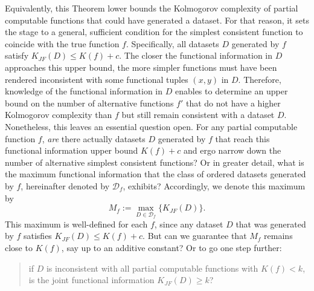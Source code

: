 Equivalently, this Theorem lower bounds the Kolmogorov complexity of partial computable functions that could have generated a dataset.
For that reason, it sets the stage to a general, sufficient condition for the simplest consistent function to coincide with the true function $f$.
Specifically, all datasets $D$ generated by $f$ satisfy $K_{JF}(D)\leq K(f) + c$.
The closer the functional information in $D$ approaches this upper bound, the more simpler functions must have been rendered inconsistent with some functional tuples $(x,y)$ in $D$.
Therefore, knowledge of the functional information in $D$ enables to determine an upper bound on the number of alternative functions $f'$ that do not have a higher Kolmogorov complexity than $f$ but still remain consistent with a dataset $D$.
Nonetheless, this leaves an essential question open. For any partial computable function $f$, \textit{are} there actually datasets $D$ generated by $f$ that reach this functional information upper bound $K(f)+c$ and ergo narrow down the number of alternative simplest consistent functions?
Or in greater detail, what is the maximum functional information that the class of ordered datasets generated by $f$, hereinafter denoted by $\mathcal{D}_f$, exhibits?
Accordingly, we denote this maximum by 
\begin{equation}
	\label{eq:max-functional-information}
	M_f:=\max_{D\in\mathcal{D}_f}\{K_{JF}(D)\}.	
\end{equation}
This maximum is well-defined for each $f$, since any dataset $D$ that was generated by $f$ satisfies $K_{JF}(D)\leq K(f)+c$.
But can we guarantee that $M_f$ remains close to $K(f)$, say up to an additive constant?
Or to go one step further:
\begin{quote}
	if $D$ is inconsistent with all partial computable functions with $K(f)<k$, is the joint functional information $K_{JF}(D)\geq k$?
\end{quote} 

